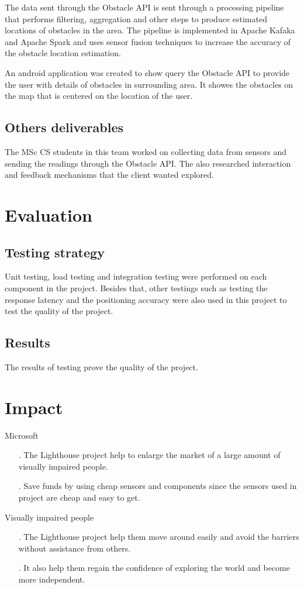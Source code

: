 \documentclass[prodmode,acmtosem]{acmsmall} %
\begin{document}
The data sent through the Obstacle API is sent through a processing pipeline that performs filtering, aggregation and other steps to produce estimated locations of obstacles in the area. The pipeline is implemented in Apache Kafaka and Apache Spark and uses sensor fusion techniques to increase the accuracy of the obstacle location estimation. 

An android application was created to show query the Obstacle API to provide the user with details of obstacles in surrounding area. It showes the obstacles on the map that is centered on the location of the user.

\subsection{Others deliverables}
The MSc CS students in this team worked on collecting data from sensors and sending the readings through the Obstacle API. The also researched interaction and feedback mechanisms that the client wanted explored.

\section{Evaluation}
\subsection{Testing strategy}
Unit testing, load testing and integration testing were performed on each component in the project. Besides that, other testings such as testing the response latency and the positioning accuracy were also used in this project to test the quality of the project.
\subsection{Results}
The results of testing prove the quality of the project. 
\section{Impact}
Microsoft
\begin{itemize}
\item[.] The Lighthouse project help to enlarge the market of a large amount of visually impaired people.\\
\item[.] Save funds by using cheap sensors and components since the sensors used in project are cheap and easy to get.
\end{itemize}
Visually impaired people
\begin{itemize}
\item[.] The Lighthouse project help them move around easily and avoid the barriers without assistance from others.\\
\item[.] It also help them regain the confidence of exploring the world and become more independent.
\end{itemize}
\end{document}
